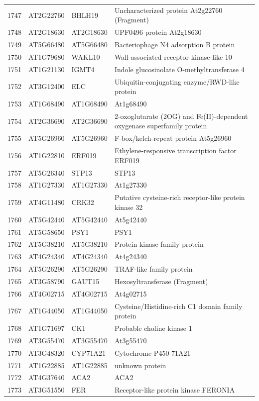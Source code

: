 \documentclass[11pt]{article}
\begin{document}
\begin{center}
\begin{tabular}{rlll}
1747 & AT2G22760 & BHLH19 & Uncharacterized protein At2g22760 (Fragment)\\
1748 & AT2G18630 & AT2G18630 & UPF0496 protein At2g18630\\
1749 & AT5G66480 & AT5G66480 & Bacteriophage N4 adsorption B protein\\
1750 & AT1G79680 & WAKL10 & Wall-associated receptor kinase-like 10\\
1751 & AT1G21130 & IGMT4 & Indole glucosinolate O-methyltransferase 4\\
1752 & AT3G12400 & ELC & Ubiquitin-conjugating enzyme/RWD-like protein\\
1753 & AT1G68490 & AT1G68490 & At1g68490\\
1754 & AT2G36690 & AT2G36690 & 2-oxoglutarate (2OG) and Fe(II)-dependent oxygenase superfamily protein\\
1755 & AT5G26960 & AT5G26960 & F-box/kelch-repeat protein At5g26960\\
1756 & AT1G22810 & ERF019 & Ethylene-responsive transcription factor ERF019\\
1757 & AT5G26340 & STP13 & STP13\\
1758 & AT1G27330 & AT1G27330 & At1g27330\\
1759 & AT4G11480 & CRK32 & Putative cysteine-rich receptor-like protein kinase 32\\
1760 & AT5G42440 & AT5G42440 & At5g42440\\
1761 & AT5G58650 & PSY1 & PSY1\\
1762 & AT5G38210 & AT5G38210 & Protein kinase family protein\\
1763 & AT4G24340 & AT4G24340 & At4g24340\\
1764 & AT5G26290 & AT5G26290 & TRAF-like family protein\\
1765 & AT3G58790 & GAUT15 & Hexosyltransferase (Fragment)\\
1766 & AT4G02715 & AT4G02715 & At4g02715\\
1767 & AT1G44050 & AT1G44050 & Cysteine/Histidine-rich C1 domain family protein\\
1768 & AT1G71697 & CK1 & Probable choline kinase 1\\
1769 & AT3G55470 & AT3G55470 & At3g55470\\
1770 & AT3G48320 & CYP71A21 & Cytochrome P450 71A21\\
1771 & AT1G22885 & AT1G22885 & unknown protein\\
1772 & AT4G37640 & ACA2 & ACA2\\
1773 & AT3G51550 & FER & Receptor-like protein kinase FERONIA\\

\end{tabular}
\end{center}
\end{document}
